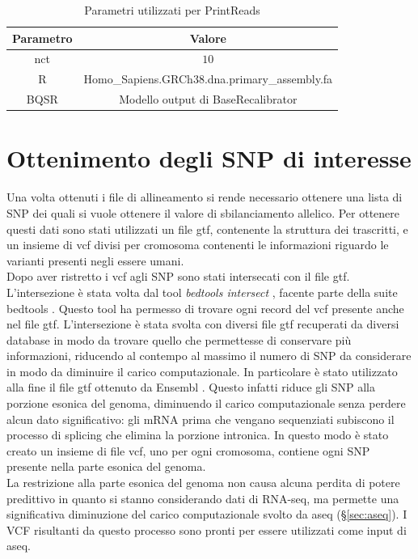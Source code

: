     \begin{table}[H]
        \centering
        \begin{tabular}{|c|c|}
                \hline
                Parametro & Valore\\
                \hline
                nct & $10$\\
                \hline
                R & Homo\_Sapiens.GRCh38.dna.primary\_assembly.fa\\
                \hline
                BQSR & Modello output di BaseRecalibrator\\
                \hline
         \end{tabular}
         \caption{Parametri utilizzati per PrintReads}
    \end{table}

  \section{Ottenimento degli SNP di interesse}
  Una volta ottenuti i file di allineamento si rende necessario ottenere una lista di SNP dei quali si vuole ottenere il valore di sbilanciamento allelico.
  Per ottenere questi dati sono stati utilizzati un file gtf, contenente la struttura dei trascritti, e un insieme di vcf divisi per cromosoma contenenti le informazioni riguardo le varianti presenti negli essere umani.\\
  Dopo aver ristretto i vcf agli SNP sono stati intersecati con il file gtf.
  L'intersezione \`e stata volta dal tool \emph{bedtools intersect} \cite{bedtoolsintersect}, facente parte della suite bedtools \cite{bedtools}.
  Questo tool ha permesso di trovare ogni record del vcf presente anche nel file gtf.
  L'intersezione \`e stata svolta con diversi file gtf recuperati da diversi database in modo da trovare quello che permettesse di conservare pi\`u informazioni, riducendo al contempo al massimo il numero di SNP da considerare in modo da diminuire il carico computazionale.
  In particolare \`e stato utilizzato alla fine il file gtf ottenuto da Ensembl \cite{ensembl}.
  Questo infatti riduce gli SNP alla porzione esonica del genoma, diminuendo il carico computazionale senza perdere alcun dato significativo: gli mRNA prima che vengano sequenziati subiscono il processo di splicing che elimina la porzione intronica.
  In questo modo \`e stato creato un insieme di file vcf, uno per ogni cromosoma, contiene ogni SNP presente nella parte esonica del genoma.\\
  La restrizione alla parte esonica del genoma non causa alcuna perdita di potere predittivo in quanto si stanno considerando dati di RNA-seq, ma permette una significativa diminuzione del carico computazionale svolto da aseq (\S\ref{sec:aseq}).
  I VCF risultanti da questo processo sono pronti per essere utilizzati come input di aseq.

